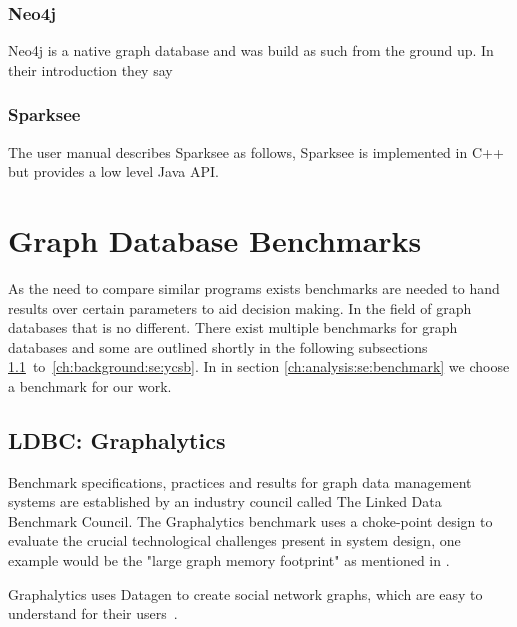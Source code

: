 \subsubsection{Neo4j}
Neo4j is a native graph database and was build as such from the ground up.
In their introduction they say 

\subsubsection{Sparksee}
The user manual describes Sparksee as follows, 
Sparksee is implemented in C++ but provides a low level Java API.

\section{Graph Database Benchmarks}
\label{ch:background:se:graphDatabaseBenchmarks}
As the need to compare similar programs exists benchmarks are needed to hand results over certain parameters to aid decision making.
In the field of graph databases that is no different.
There exist multiple benchmarks for graph databases and some are outlined shortly in the following subsections \ref{ch:background:se:ldbcGraphalytics}~to~\ref{ch:background:se:ycsb}.
In in section \ref{ch:analysis:se:benchmark} we choose a benchmark for our work.

\subsection{LDBC: Graphalytics}
\label{ch:background:se:ldbcGraphalytics}
Benchmark specifications, practices and results for graph data management systems are established by an industry council called The Linked Data Benchmark Council.
The Graphalytics benchmark uses a choke-point design to evaluate the crucial technological challenges present in system design,
one example would be the "large graph memory footprint" as mentioned in \cite[2]{Capota2015c}.

Graphalytics uses Datagen to create social network graphs,
which are easy to understand for their users \cite[3]{Capota2015c}.

